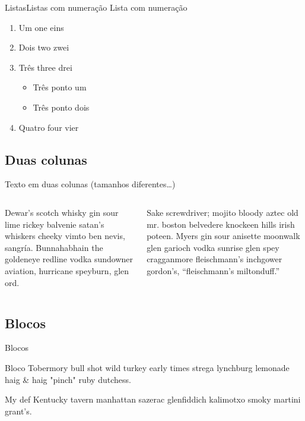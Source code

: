 \documentclass[
    brazilian, %
    12pt, %
    aspectratio = 169, %
]{beamer}
\begin{document}
\begin{frame}{Listas}{Listas com numeração}
    Lista com numeração

    \begin{enumerate}
        \item Um one eins
        \item Dois two zwei
        \item Três three drei
        \begin{itemize}
            \item Três ponto um
            \item Três ponto dois
        \end{itemize}
        \item Quatro four vier
    \end{enumerate}
\end{frame}

\subsection{Duas colunas}

\begin{frame}
    Texto em duas colunas (tamanhos diferentes\ldots)

    \vspace{1em}
    \begin{columns}[t]
        \begin{column}{0.4\linewidth}
            Dewar's scotch whisky gin sour lime rickey balvenie satan's whiskers cheeky vimto ben nevis, sangría. Bunnahabhain the goldeneye redline vodka sundowner aviation, hurricane speyburn, glen ord.
        \end{column}
        \begin{column}{0.6\linewidth}
            Sake screwdriver; mojito bloody aztec old mr. boston belvedere knockeen hills irish poteen. Myers gin sour anisette moonwalk glen garioch vodka sunrise glen spey cragganmore fleischmann's inchgower gordon's, ``fleischmann's miltonduff.''
        \end{column}
    \end{columns}
\end{frame}

\subsection{Blocos}

\begin{frame}{Blocos}
    \begin{block}{Bloco}
        Tobermory bull shot wild turkey early times strega lynchburg lemonade haig \& haig "pinch" ruby dutchess.
    \end{block}

    \begin{definition}{My def}
        Kentucky tavern manhattan sazerac glenfiddich kalimotxo smoky martini grant's.
    \end{definition}

\end{frame}
\end{document}
